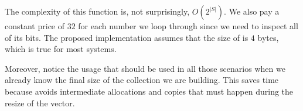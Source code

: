 The complexity of this function is, not surprisingly, $O(2^{|S|})$. 
We also pay a constant price of $32$ for each number we loop through since we need to inspect all of its bits.
The proposed implementation assumes that the size of  is $4$ bytes, 
which is true for most systems.

Moreover, notice the usage 
that should be used in all those scenarios when we already know the final size of the
collection we are building. This saves time because avoids intermediate allocations and copies that must happen during the resize of the vector.







